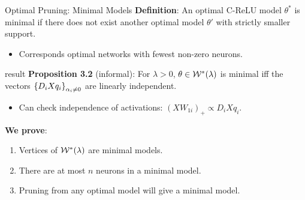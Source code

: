 \documentclass[usenames,dvipsnames,mathserif,notheorems]{beamer}
\newcommand{\bad}[1]{\textcolor{bad}{#1}}
\newcommand{\good}[1]{\textcolor{good}{#1}}
\begin{document}
\begin{frame}{Optimal Pruning: Minimal Models}
	\textbf{Definition}: An optimal C-ReLU model \( \theta^* \) is minimal if
	there does not exist another optimal model \( \theta' \) with \bad{strictly
		smaller support}.

	\begin{itemize}
		\item Corresponds optimal networks with fewest non-zero neurons.
	\end{itemize}


	\vspace{3ex}
	\pause

	\begin{beamercolorbox}[wd=\textwidth,sep=1em]{result}
		\textbf{Proposition 3.2} (informal):
		For \( \lambda > 0 \), \( \theta \in \mathcal{W}^*(\lambda) \) is \good{minimal}
		iff
		the vectors \( \left\{D_i X q_i\right\}_{\alpha_i \neq 0} \)
		are linearly independent.
	\end{beamercolorbox}

	\pause

	\begin{itemize}
		\item Can check independence of activations:
		      \( (X W_{1i})_+ \propto D_i X q_i \).
	\end{itemize}

	\vspace{2ex}
	\pause


	\textbf{We prove}:
	\begin{enumerate}
		\item Vertices of \( \mathcal{W}^*(\lambda) \) are minimal models.
		      \pause
		\item There are at most \( n \) neurons in a minimal model.
		      \pause
		\item Pruning from any optimal model will give a minimal model.
	\end{enumerate}

\end{frame}
\end{document}
